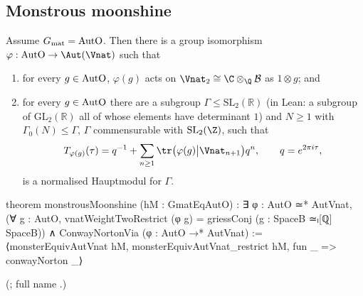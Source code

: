 \subsection{Monstrous moonshine}

\begin{theorem}\label{ch22:thm:monstrous}
Assume $G_{\mathrm{mat}}=\mathrm{AutO}$.  Then there is a group isomorphism $\varphi:\chtwentytwoAutO\to\Aut(\Vnat)$ such that
\begin{enumerate}[label=(\roman*)]
\item for every $g\in\mathrm{AutO}$, $\varphi(g)$ acts on $\Vnat_2\cong\C\otimes_\Q\chtwentytwoB$ as $1\otimes g$; and
\item for every $g\in\mathrm{AutO}$ there are a subgroup $\Gamma\le\mathrm{SL}_2(\mathbb{R})$ (in Lean: a subgroup of
  $\mathrm{GL}_2(\mathbb{R})$ all of whose elements have determinant $1$) and $N\ge1$ with $\Gamma_0(N)\le\Gamma$, $\Gamma$ commensurable with $\mathrm{SL}_2(\Z)$, such that
  \begin{equation*}
    T_{\varphi(g)}(\tau)=q^{-1}+\sum_{n\ge1}\tr\bigl(\varphi(g)\big|\Vnat_{n+1}\bigr)q^n,\qquad q=e^{2\pi i\tau},
  \end{equation*}
  is a normalised Hauptmodul for $\Gamma$.
\end{enumerate}
\end{theorem}
\begin{leancode}
theorem monstrousMoonshine (hM : GmatEqAutO) :
    ∃ φ : AutO ≃* AutVnat,
      (∀ g : AutO, vnatWeightTwoRestrict (φ g) = griessConj (g : SpaceB ≃ₗ[ℚ] SpaceB)) ∧
        ConwayNortonVia (φ : AutO →* AutVnat) :=
  ⟨monsterEquivAutVnat hM, monsterEquivAutVnat_restrict hM, fun _ => conwayNorton _⟩
\end{leancode}
(; full name .)

